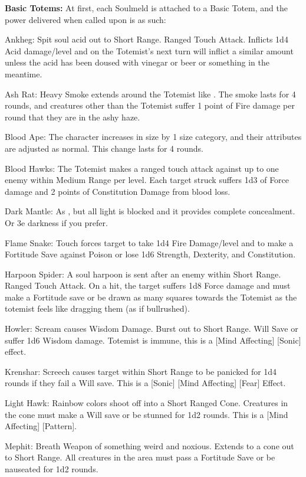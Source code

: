\textbf{Basic Totems:} At first, each Soulmeld is attached to a Basic Totem, and the power delivered when called upon is as such:
\begin{description*}
\item[Ankheg:] Spit soul acid out to Short Range. Ranged Touch Attack. Inflicts 1d4 Acid damage/level and on the Totemist's next turn will inflict a similar amount unless the acid has been doused with vinegar or beer or something in the meantime.
\item[Ash Rat:] Heavy Smoke extends around the Totemist like . The smoke lasts for 4 rounds, and creatures other than the Totemist suffer 1 point of Fire damage per round that they are in the ashy haze.
\item[Blood Ape:] The character increases in size by 1 size category, and their attributes are adjusted as normal. This change lasts for 4 rounds.
\item[Blood Hawks:] The Totemist makes a ranged touch attack against up to one enemy within Medium Range per level. Each target struck suffers 1d3 of Force damage and 2 points of Constitution Damage from blood loss.
\item[Dark Mantle:] As , but all light is blocked and it provides complete concealment. Or 3e darkness if you prefer.
\item[Flame Snake:] Touch forces target to take 1d4 Fire Damage/level and to make a Fortitude Save against Poison or lose 1d6 Strength, Dexterity, and Constitution.
\item[Harpoon Spider:] A soul harpoon is sent after an enemy within Short Range. Ranged Touch Attack. On a hit, the target suffers 1d8 Force damage and must make a Fortitude save or be drawn as many squares towards the Totemist as the totemist feels like dragging them (as if bullrushed).
\item[Howler:] Scream causes Wisdom Damage. Burst out to Short Range. Will Save or suffer 1d6 Wisdom damage. Totemist is immune, this is a [Mind Affecting] [Sonic] effect.
\item[Krenshar:] Screech causes target within Short Range to be panicked for 1d4 rounds if they fail a Will save. This is a [Sonic] [Mind Affecting] [Fear] Effect.
\item[Light Hawk:] Rainbow colors shoot off into a Short Ranged Cone. Creatures in the cone must make a Will save or be stunned for 1d2 rounds. This is a [Mind Affecting] [Pattern].
\item[Mephit:] Breath Weapon of something weird and noxious. Extends to a cone out to Short Range. All creatures in the area must pass a Fortitude Save or be nauseated for 1d2 rounds.

\end{description*}
